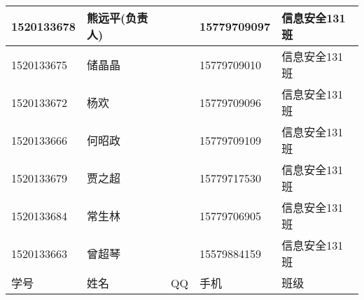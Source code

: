 \documentclass[12pt,a4paper]{article}
\begin{document}
\begin{CJK}{UTF8}{gbsn}
\begin{flushleft}
\begin{longtable}{|l|l|l|l|l|}
 1520133678    &  熊远平(负责人)  &     & 15779709097 & 信息安全131班 \\ \hline 
 1520133675    &  储晶晶  &     & 15779709010 & 信息安全131班 \\ \hline
 1520133672    &  杨欢    &     & 15779709096 & 信息安全131班 \\ \hline
 1520133666    &  何昭政  &     & 15779709109 & 信息安全131班 \\ \hline
 1520133679    &  贾之超  &     & 15779717530 & 信息安全131班 \\ \hline
 1520133684    &  常生林  &     & 15779706905 & 信息安全131班 \\ \hline
 1520133663    &  曾超琴  &     & 15579884159 & 信息安全131班 \\ \hline





学号 & 姓名 & QQ & 手机 & 班级 \\ \hline







\end{longtable}


\end{flushleft}

\end{CJK}
\end{document}
